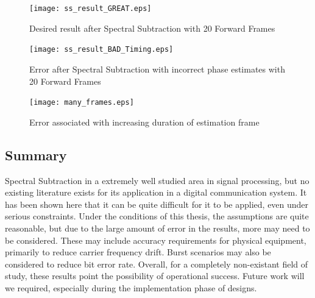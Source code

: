 \begin{figure}\label{ss_result_great}
\centering
\texttt{[image: ss\_result\_GREAT.eps]}
\caption{Desired result after Spectral Subtraction with 20 Forward Frames}
\end{figure}

\begin{figure}\label{ss_result_bad}
\centering
\texttt{[image: ss\_result\_BAD\_Timing.eps]}
\caption{Error after Spectral Subtraction with incorrect phase estimates with 20 Forward Frames}
\end{figure}

\begin{figure}\label{many_frames}
\centering
\texttt{[image: many\_frames.eps]}
\caption{Error associated with increasing duration of estimation frame}
\end{figure}




\subsection{Summary}

Spectral Subtraction in a extremely well studied area in signal processing, but no existing literature exists for its application in a digital communication system.  It has been shown here that it can be quite difficult for it to be applied, even under serious constraints.  Under the conditions of this thesis, the assumptions are quite reasonable, but due to the large amount of error in the results, more may need to be considered.  These may include accuracy requirements for physical equipment, primarily to reduce carrier frequency drift.  Burst scenarios may also be considered to reduce bit error rate.  Overall, for a completely non-existant field of study, these results point the possibility of operational success.  Future work will we required, especially during the implementation phase of designs.\\

